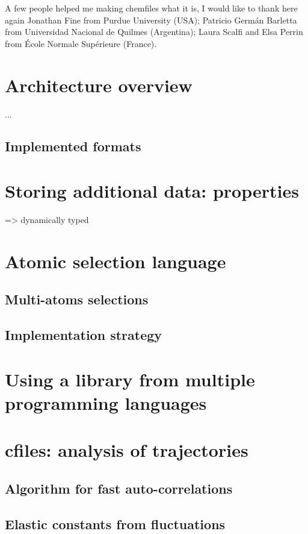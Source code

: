 \documentclass[thesis]{subfiles}
\begin{document}
A few people helped me making chemfiles what it is, I would like to thank here
again Jonathan Fine from Purdue University (USA); Patricio Germán Barletta from
Universidad Nacional de Quilmes (Argentina); Laura Scalfi and Elsa Perrin from
École Normale Supérieure (France).

\section{Architecture overview}

...

\subsection{Implemented formats}

\section{Storing additional data: properties}

=> dynamically typed

\section{Atomic selection language}

\subsection{Multi-atoms selections}

\subsection{Implementation strategy}

\section{Using a library from multiple programming languages}

\section{cfiles: analysis of trajectories}

\subsection{Algorithm for fast auto-correlations}

\subsection{Elastic constants from fluctuations}

\OnlyInSubfile{\printglobalbibliography}
\end{document}
